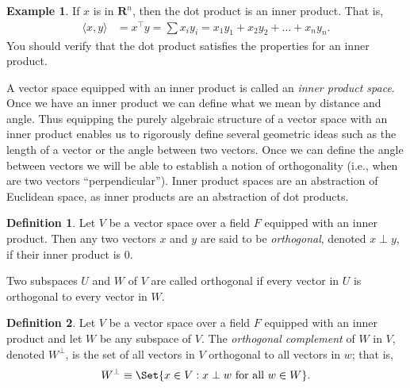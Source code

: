 \documentclass[]{article}
\theoremstyle{plain}
\theoremstyle{definition}
\newtheorem{defn}{Definition}
\newtheorem*{exmp*}{Example}
\theoremstyle{remark}
\newcommand{\reals}{\mathbf{R}}
\begin{document}
\begin{exmp*}
If $x$ is in $\reals^n$, then the dot product is an inner product. That is,
\begin{align*}
\langle x, y\rangle &= x^\top y = \sum x_i y_i = x_1 y_1 + x_2 y_2 + \dots + x_n y_n.
\end{align*}
You should verify that the dot product satisfies the properties for an
inner product.
\end{exmp*}

A vector space equipped with an inner product is called an \emph{inner product
space}.  Once we have an inner product we can define what we mean by distance
and angle.  Thus equipping the purely algebraic structure of a vector space
with an inner product enables us to rigorously define several geometric ideas
such as the length of a vector or the angle between two vectors.  Once we can
define the angle between vectors we will be able to establish a notion of
orthogonality (i.e., when are two vectors ``perpendicular'').  Inner product
spaces are an abstraction of Euclidean space, as inner products are an
abstraction of dot products.

\begin{defn}
Let $V$ be a vector space over a field $F$ equipped with an inner product.
Then any two vectors $x$ and $y$ are said to be \emph{orthogonal}, denoted
$x \perp y$, if their inner product is $0$.
\end{defn}

Two subspaces $U$ and $W$ of $V$ are called orthogonal if every vector in
$U$ is orthogonal to every vector in $W$.

\begin{defn}
Let $V$ be a vector space over a field $F$ equipped with an inner product
and let $W$ be any subspace of $V$.  The
\emph{orthogonal complement} of $W$ in $V$, denoted $W^\perp$, is the set
of all vectors in $V$ orthogonal to all vectors in $w$; that is,
\begin{align*}
W^\perp \equiv \Set{x \in V : x \perp w \text{ for all } w \in W}.
\end{align*}
\end{defn}
\end{document}

